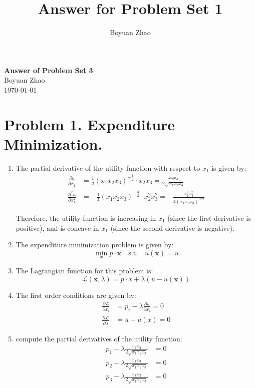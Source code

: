 \documentclass[UTF8,titlepage]{article}
\title{Answer for Problem Set 1}
\author{Boyuan Zhao}
\numberwithin{figure}{section}
\begin{document}
\begin{center}
    {\LARGE \textbf{Answer of Problem Set 3}}\\  %
    {\normalsize Boyuan Zhao}\\  %
    {\small \today}  %
\end{center}
\section{Problem 1. Expenditure Minimization.}
\begin{enumerate}
    \item The partial derivative of the utility function with respect to $x_1$ is given by:
    \begin{align*}
        \frac{\partial u}{\partial x_1} &= \frac{1}{2} (x_1 x_2 x_3)^{-\frac{1}{2}} \cdot x_2 x_3 = \frac{x_2 x_3}{2 \sqrt{x_1 x_2 x_3}} \\
        \frac{\partial^2 u}{\partial x_1^2} &= -\frac{1}{4} (x_1 x_2 x_3)^{-\frac{3}{2}} \cdot x_2^2 x_3^2 = -\frac{x_2^2 x_3^2}{4 (x_1 x_2 x_3)^{3/2}}
        \end{align*}
        
    Therefore, the utility function is increasing in $x_1$ (since the first derivative is positive), and is concave in $x_1$ (since the second derivative is negative).
    
    \item The expenditure minimization problem is given by:
    \begin{equation*}
        \min_{x} p \cdot \textbf{x} \quad \text{s.t.} \quad u(\textbf{x}) = \bar{u}
        \end{equation*}
        
    \item The Lagrangian function for this problem is:
    \begin{equation*}
        \mathcal{L}(\textbf{x}, \lambda) = p \cdot x + \lambda(\bar{u} - u(\textbf{x}))
        \end{equation*}
    
    \item The first order conditions are given by:
    \begin{align*}
        \frac{\partial \mathcal{L}}{\partial x_i} &= p_i - \lambda \frac{\partial u}{\partial x_i} = 0 \\
        \frac{\partial \mathcal{L}}{\partial \lambda} &= \bar{u} - u(x) = 0
        \end{align*}
    \item compute the partial derivatives of the utility function:
    \begin{align*}
        p_1 - \lambda \frac{x_2 x_3}{2\sqrt{x_1 x_2 x_3}} &= 0 \\
        p_2 - \lambda \frac{x_1 x_3}{2\sqrt{x_1 x_2 x_3}} &= 0 \\
        p_3 - \lambda \frac{x_1 x_2}{2\sqrt{x_1 x_2 x_3}} &= 0
        \end{align*}
        

\end{enumerate}
\end{document}
